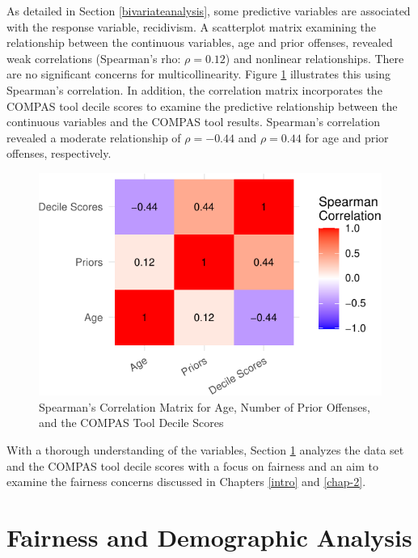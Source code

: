 \documentclass[12pt, twoside]{amherstthesis}
\begin{document}
As detailed in Section \ref{bivariateanalysis}, some predictive variables are associated with the response variable, recidivism. A scatterplot matrix examining the relationship between the continuous variables, age and prior offenses, revealed weak correlations (Spearman's rho: \(\rho = 0.12\)) and nonlinear relationships. There are no significant concerns for multicollinearity. Figure \ref{fig:ch3fig7} illustrates this using Spearman's correlation. In addition, the correlation matrix incorporates the COMPAS tool decile scores to examine the predictive relationship between the continuous variables and the COMPAS tool results. Spearman's correlation revealed a moderate relationship of \(\rho = -0.44\) and \(\rho = 0.44\) for age and prior offenses, respectively.
\begin{figure}

{\centering \includegraphics{Dasha-Asienga_StatThesis_files/figure-latex/ch3fig7-1} 

}

\caption{Spearman's Correlation Matrix for Age, Number of Prior Offenses, and the COMPAS Tool Decile Scores}\label{fig:ch3fig7}
\end{figure}
With a thorough understanding of the variables, Section \ref{fairnessanalysis} analyzes the data set and the COMPAS tool decile scores with a focus on fairness and an aim to examine the fairness concerns discussed in Chapters \ref{intro} and \ref{chap-2}.

\hypertarget{fairnessanalysis}{%
\section{Fairness and Demographic Analysis}\label{fairnessanalysis}}
\end{document}
